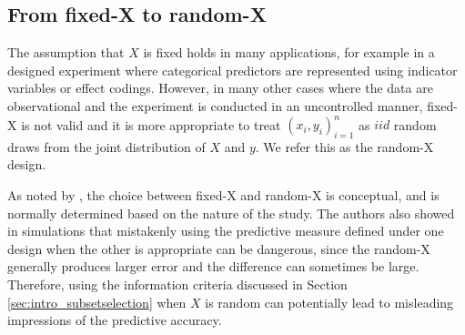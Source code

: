 \subsection{From fixed-X to random-X}
The assumption that $X$ is fixed holds in many applications, for example in a designed experiment where categorical predictors are represented using indicator variables or effect codings. However, in many other cases where the data are observational and the experiment is conducted in an uncontrolled manner, fixed-X is not valid and it is more appropriate to treat $(x_i,y_i)_{i=1}^n$ as $iid$ random draws from the joint distribution of $X$ and $y$. We refer this as the random-X design. %

As noted by \citet{breiman1992submodel}, the choice between fixed-X and random-X is conceptual, and is normally determined based on the nature of the study. The authors also showed in simulations that mistakenly using the predictive measure defined under one design when the other is appropriate can be dangerous, since the random-X generally produces larger error and the difference can sometimes be large. Therefore, using the information criteria discussed in Section \ref{sec:intro_subsetselection} when $X$ is random can potentially lead to misleading impressions of the predictive accuracy.

